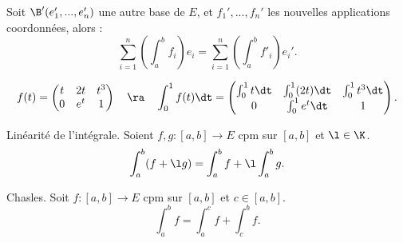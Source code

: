 \documentclass[11pt]{article}
\begin{document}
\begin{exercice}{}{}
    Soit $\B'(e_1',...,e_n')$ une autre base de $E$, et $f_1',...,f_n'$ les nouvelles applications coordonnées, alors :
    \begin{equation*}
        \sum_{i=1}^n\left( \int_a^b f_i \right)e_i = \sum_{i=1}^n\left( \int_a^bf'_i \right)e_i'.
    \end{equation*}
\end{exercice}

\begin{ex}{}{}
    \begin{equation*}
        f(t) = \begin{pmatrix}t&2t&t^3\\0&e^t&1\end{pmatrix} \quad \ra \quad \int_0^1f(t)\dt = \begin{pmatrix}\int_0^1t\dt & \int_0^1(2t)\dt & \int_0^1t^3\dt \\ 0 & \int_0^1e^t\dt & 1\end{pmatrix}.
    \end{equation*}
\end{ex}

\begin{prop}{Linéarité de l'intégrale.}{}
    Soient $f,g:[a,b]\to E$ cpm sur $[a,b]$ et $\l\in\K$.
    \begin{equation*}
        \int_a^b(f+\l g) = \int_a^b f + \l\int_a^bg.
    \end{equation*}
\end{prop}

\begin{prop}{Chasles.}{}
    Soit $f:[a,b]\to E$ cpm sur $[a,b]$ et $c\in[a,b]$.
    \begin{equation*}
        \int_a^b f = \int_a^c f + \int_c^b f.
    \end{equation*}
\end{prop}
\end{document}
